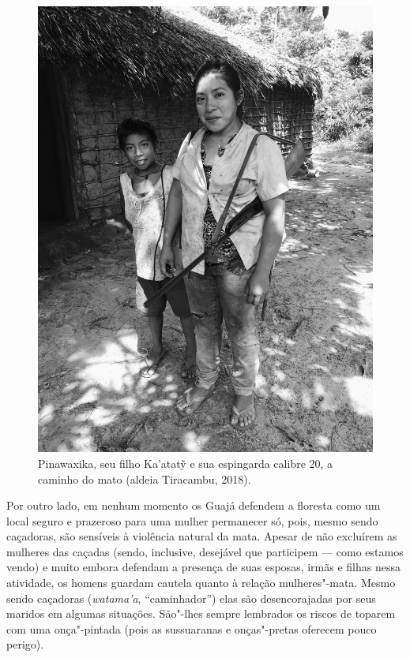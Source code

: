 \begin{figure}[H]
\centering
  \includegraphics[width=\textwidth]{./imgs/IMG_4463}
\caption{Pinawaxika, seu filho Ka'atatỹ e sua espingarda calibre 20, a caminho do
mato (aldeia Tiracambu, 2018).}
\end{figure}

Por outro lado, em nenhum momento os Guajá defendem a floresta como um
local seguro e prazeroso para uma mulher permanecer só, pois, mesmo
sendo caçadoras, são sensíveis à violência natural da mata. Apesar de
não excluírem as mulheres das caçadas (sendo, inclusive, desejável que
participem --- como estamos vendo) e muito embora defendam a presença de
suas esposas, irmãs e filhas nessa atividade, os homens guardam cautela
quanto à relação mulheres"-mata. Mesmo sendo caçadoras (\emph{watama'a},
``caminhador'') elas são desencorajadas por seus maridos em algumas
situações. São"-lhes sempre lembrados os riscos de toparem com uma
onça"-pintada (pois as sussuaranas e onças"-pretas oferecem pouco perigo).

